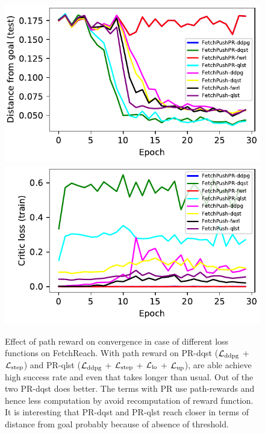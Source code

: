 \begin{figure}
  \includegraphics[width=\frac\columnwidth]{./media/res/be0910c-her_fwrl_path_reward-FetchPushPR-v1-fwrl/test/ag_g_dist.pdf}%
  \includegraphics[width=\frac\columnwidth]{./media/res/be0910c-her_fwrl_path_reward-FetchPushPR-v1-fwrl/train/critic_loss.pdf}%
  \label{fig:path-reward-1}%
  \caption{Effect of path reward on convergence in case of different loss
    functions on FetchReach. With path reward on PR-dqst
    ($\mathcal{L}_{\text{ddpg}}$ + $\mathcal{L}_{\text{step}}$)
    and PR-qlst
    ($\mathcal{L}_{\text{ddpg}}$ + $\mathcal{L}_{\text{step}}$ + $\mathcal{L}_{\text{lo}}$ + $\mathcal{L}_{\text{up}}$), are able achieve high
    success rate and even that takes longer than usual. Out of the two PR-dqst
    does better. The terms with PR use path-rewards and hence less computation
    by avoid recomputation of reward function. It is interesting that PR-dqst
    and PR-qlst reach closer in terms of distance from goal probably because of
    absence of threshold.}%
\end{figure}%
% 

